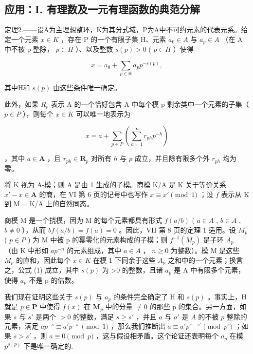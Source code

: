 \subsection{应用：I. 有理数及一元有理函数的典范分解}

定理2.——设A为主理想整环，K为其分式域，P为A中不可约元素的代表元系。给定一个元素 \(x \in K\) ，存在 P 的一个有限子集 H、元素 \(a_{0} \in A\) 与 \(a_{p} \in A\) （在 A 中不被 p 整除， \(p \in H\) ）、以及整数 \(s(p) > 0\) ( \(p \in H\) ）使得

\[
x = a _ {0} + \sum_ {p \in \mathrm{H}} a _ {p} p ^ {- s (p)},\tag{1}
\]

其中H和 \(s(p)\) 由这些条件唯一确定。

此外，如果 \(R_{p}\) 表示 A 的一个恰好包含 A 中每个模 p 剩余类中一个元素的子集（ \(p \in P\) ），则每个 \(x \in K\) 可以唯一地表示为

\[
x = a + \sum_ {p \in P} \left(\sum_ {h = 1} ^ {\infty} r _ {p h} p ^ {- h}\right)\tag{2}
\]

，其中 \(a \in \mathbf{A}\) ，且 \(r_{ph} \in \mathbf{R}_p\) 对所有 \(h\) 与 \(p\) 成立，并且除有限多个外 \(r_{ph}\) 均为零。

将 K 视为 A-模；则 A 是由 1 生成的子模。商模 K/A 是 K 关于等价关系 \(x' - x \in \mathbf{A}\) 的商，在 VI 第 6 页的记号中也写作 \(x \equiv x' \pmod{1}\) ；设 \(f\) 表示从 K 到 M = K/A 上的自然同态。

商模 M 是一个挠模，因为 M 的每个元素都具有形式 \(f(a/b)\) ( \(a \in A\) , \(b \in A\) , \(b \neq 0\) ），从而 \(bf(a/b) = f(a) = 0\) 。因此，VII 第 8 页的定理 1 适用。设 \(M_{p}\) ( \(p \in P\) ) 为 M 中被 p 的幂零化的元素构成的子模；则 \(f^{-1}(M_{p})\) 是子环 \(A_{p}\) （由 K 中形如 \(ap^{-n}\) 的元素组成，其中 \(a \in A\) ， \(n \geqslant 0\) 为整数）。模 M 是这些 \(M_{p}\) 的直和，因此每个 \(x \in K\) 在模 1 下同余于这些 \(A_{p}\) 之和中的一个元素；换言之，公式 (1) 成立，其中 \(s(p)\) 为 \textgreater0 的整数，且诸 \(a_{p}\) 是 A 中有限多个元素，使得 \(a_{p}\) 不是 p 的倍数。

我们现在证明这些关于 \(s(p)\) 与 \(a_{p}\) 的条件完全确定了 H 和 \(s(p)\) 。事实上，H 就是 \(p \in \mathbf{P}\) 中使得 \(f(x)\) 在 \(\mathbf{M}_{p}\) 中的分量 \(\neq 0\) 的那些 p 的集合。另一方面，如果 \(s\) 与 \(s'\) 是两个 \(>0\) 的整数，满足 \(s \geqslant s'\) ，并且 \(a\) 与 \(a'\) 是 \(A\) 的不被 \(p\) 整除的元素，满足 \(ap^{-s} \equiv a'p^{-s'} \pmod{1}\) ，那么我们推断出 \(a \equiv a'p^{s - s'} \pmod{p^s}\) ；如果 \(s > s'\) ，则 \(a \equiv 0 \pmod{p}\) ，这与假设相矛盾。这个论证还表明每个 \(a_p\) 在模 \(p^{s(p)}\) 下是唯一确定的.

